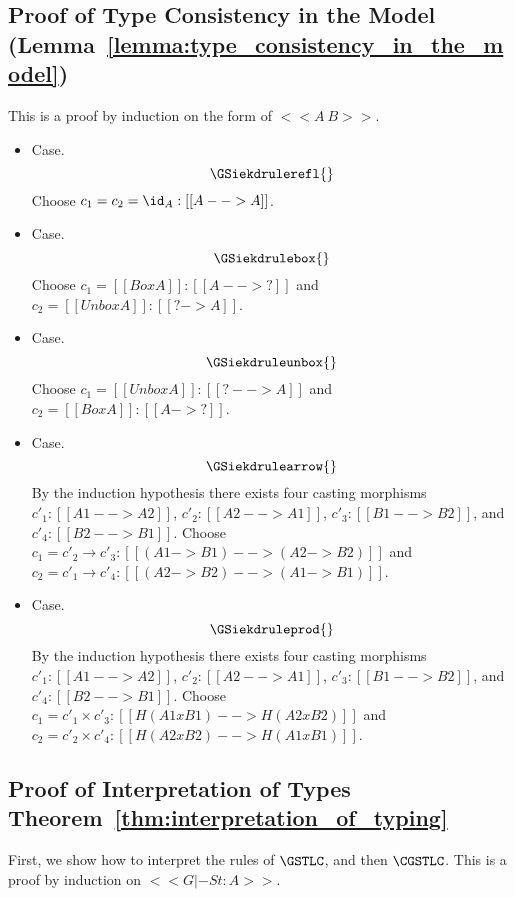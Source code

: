 \subsection{Proof of Type Consistency in the Model (Lemma~\ref{lemma:type_consistency_in_the_model})}
\label{subsec:proof_of_type_consistency_in_the_model}
This is a proof by induction on the form of $<<A ~ B>>$.
\begin{itemize}
\item[] Case.
  \[
  \GSiekdrulerefl{}
  \]
  Choose $c_1 = c_2 = \id_A : [[A --> A]]$.

\item[] Case.
  \[
  \GSiekdrulebox{}
  \]
  Choose $c_1 = [[Box A]] : [[A --> ?]]$ and $c_2 = [[Unbox A]] : [[? -> A]]$.

\item[] Case.
  \[
  \GSiekdruleunbox{}
  \]
  Choose $c_1 = [[Unbox A]] : [[? --> A]]$ and $c_2 = [[Box A]] : [[A -> ?]]$.
  
\item[] Case.
  \[
  \GSiekdrulearrow{}
  \]
  By the induction hypothesis there exists four casting morphisms
  $c'_1 : [[A1 --> A2]]$, $c'_2 : [[A2 --> A1]]$, $c'_3 : [[B1 --> B2]]$,
  and $c'_4 : [[B2 --> B1]]$.  Choose
  $c_1 = c'_2 \to c'_3 : [[(A1 -> B1) --> (A2 -> B2)]]$
  and
  $c_2 = c'_1 \to c'_4 : [[(A2 -> B2) --> (A1 -> B1)]]$.

\item[] Case.
  \[
  \GSiekdruleprod{}
  \]
  By the induction hypothesis there exists four casting morphisms
  $c'_1 : [[A1 --> A2]]$, $c'_2 : [[A2 --> A1]]$, $c'_3 : [[B1 --> B2]]$,
  and $c'_4 : [[B2 --> B1]]$.
  Choose
  $c_1 = c'_1 \times c'_3 : [[H(A1 x B1) --> H(A2 x B2)]]$
  and
  $c_2 = c'_2 \times c'_4 : [[H(A2 x B2) --> H(A1 x B1)]]$.
\end{itemize}

\subsection{Proof of Interpretation of Types Theorem~\ref{thm:interpretation_of_typing}}
\label{subsec:proof_of_interpretation_of_types}
  First, we show how to interpret the rules of $\GSTLC$, and then $\CGSTLC$.
  This is a proof by induction on $<<G |-S t : A>>$.

